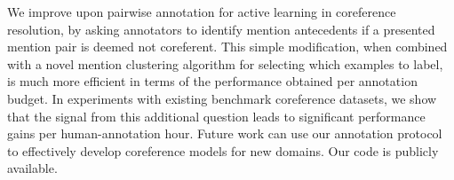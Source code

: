 We improve upon pairwise annotation for active learning in coreference resolution, by asking annotators to identify mention antecedents if a presented mention pair is deemed not coreferent. This simple modification, when combined with a novel mention clustering algorithm for selecting which examples to label, is much more efficient in terms of the performance obtained per annotation budget. In experiments with existing benchmark coreference datasets, we show that the signal from this additional question leads to significant performance gains per human-annotation hour. Future work can use our annotation protocol to effectively develop coreference models for new domains. Our code is publicly available.
